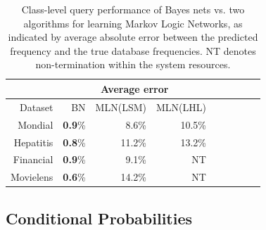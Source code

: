 \documentclass[oribibl]{llncs}
\begin{document}
\begin{table}[thbp] \centering
\caption{Class-level query performance of Bayes nets vs. two algorithms for learning Markov Logic Networks, as indicated by average absolute error between the predicted frequency and the true database frequencies.
 NT denotes non-termination within the system resources. %
}
\begin{tabular}{|r|r|r|r|r|r|r|r|r|}
\hline & \multicolumn{3}{|c|}{Average error}\\
\hline
    Dataset & BN & MLN(LSM) & MLN(LHL)\\
\hline
    Mondial &\textbf{0.9}\% & 8.6\% &10.5\% \\
    Hepatitis &\textbf{ 0.8}\% & 11.2\% & 13.2\%\\
    Financial & \textbf{0.9}\% & 9.1\% & NT\\
    Movielens  &\textbf{0.6}\% & 14.2\% & NT\\
\hline
\end{tabular}
\label{table:mln-results}
\end{table}


\subsection{Conditional Probabilities}\label{sec:conditional-probabilities}
\end{document}
